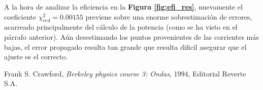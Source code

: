 \documentclass[11pt,a4paper]{article}
\begin{document}
A la hora de analizar la eficiencia en la \textbf{Figura \ref{fig:efi_res}}, nuevamente el coeficiente $\chi_{red}^{2} = 0.00155$ previene sobre una enorme sobrestimación de errores, acarreado principalmente del cálculo de la potencia (como se ha visto en el párrafo anterior). Aún desestimando los puntos provenientes de las corrientes más bajas, el error propagado resulta tan grande que resulta dificil asegurar que el ajuste es el correcto. 






\begin{thebibliography}{1}
  Frank S. Crawford, \textit{Berkeley physics course 3: Ondas}, 1994, Editorial Reverte S.A.
\end{thebibliography}
 
\end{document}
